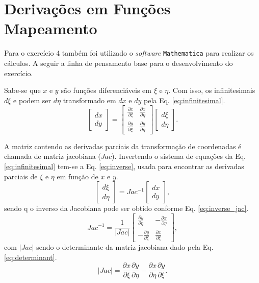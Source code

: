 \section{Deriva\c{c}\~oes em Fun\c{c}\~oes Mapeamento}\label{sec:derivative}
Para o exerc\'icio 4 tamb\'em foi utilizado o \textit{software} \texttt{Mathematica} para realizar os c\'alculos. A seguir a linha de pensamento base para o desenvolvimento do exerc\'icio.

Sabe-se que $x$ e $y$ s\~ao fun\c{c}\~oes diferenci\'aveis em $\xi$ e $\eta$. Com isso, os infinitesimais $d\xi$ e podem ser $d\eta$ transformado em $dx$ e $dy$ pela Eq. \eqref{eq:infinitesimal}.
\begin{equation}
    \begin{bmatrix}
        dx \\
        dy
    \end{bmatrix}
    =
    \begin{bmatrix}
        \frac{\partial x}{\partial \xi} & \frac{\partial x}{\partial \eta} \\
        \frac{\partial y}{\partial \xi} & \frac{\partial y}{\partial \eta}
    \end{bmatrix}
    \begin{bmatrix}
        d\xi\\
        d\eta
    \end{bmatrix}.
    \label{eq:infinitesimal}
\end{equation}

A matriz contendo as derivadas parciais da transforma\c{c}\~ao de coordenadas \'e chamada de matriz jacobiana ($Jac$). Invertendo o sistema de equa\c{c}\~oes da Eq. \eqref{eq:infinitesimal} tem-se a Eq. \eqref{eq:inverse}, usada para encontrar as derivadas parciais de $\xi$ e $\eta$ em fun\c{c}\~ao de $x$ e $y$.
\begin{equation}
    \begin{bmatrix}
        d\xi\\
        d\eta
    \end{bmatrix}
    =
    Jac^{-1}
    \begin{bmatrix}
        dx \\
        dy
    \end{bmatrix},
    \label{eq:inverse}
\end{equation}
sendo q o inverso da Jacobiana pode ser obtido conforme Eq. \eqref{eq:inverse_jac}.
\begin{equation}
    Jac^{-1} = \frac{1}{|Jac|}
    \begin{bmatrix}
        \frac{\partial y}{\partial \eta} & -\frac{\partial x}{\partial \eta} \\
        -\frac{\partial y}{\partial \xi} & \frac{\partial x}{\partial \xi}
    \end{bmatrix},
    \label{eq:inverse_jac}
\end{equation}
com $|Jac|$ sendo o determinante da matriz jacobiana dado pela Eq. \eqref{eq:determinant}.
\begin{equation}
    |Jac| = \frac{\partial x}{\partial \xi}\frac{\partial y}{\partial \eta} - \frac{\partial x}{\partial \eta}\frac{\partial y}{\partial \xi}.
    \label{eq:determinant}
\end{equation}

